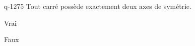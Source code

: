 \begin{truefalse}{q-1275}
Tout carré possède exactement deux axes de symétrie.
\item Vrai
\item* Faux
\end{truefalse}


